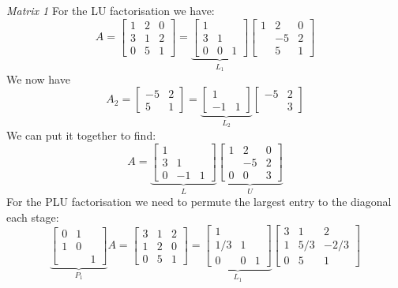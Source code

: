 \documentclass[12pt,a4paper]{article}
\begin{document}
\emph{Matrix 1} For the LU factorisation we have:
\[
A = \begin{bmatrix}
1 & 2 & 0 \\
3 & 1 & 2 \\
0 & 5 & 1
\end{bmatrix}= \underbrace{\begin{bmatrix}
1 \\
3 & 1 \\
0 & 0 & 1
\end{bmatrix}}_{L_1}   \begin{bmatrix}
1 & 2 & 0 \\
 & -5 & 2 \\
 & 5 & 1
\end{bmatrix}
\]
We now have
\[
A_2 = \begin{bmatrix}
  -5 & 2 \\
  5 & 1 \end{bmatrix} = 
  \underbrace{\begin{bmatrix}
    1\\
    -1 & 1
\end{bmatrix}}_{L_2}   \begin{bmatrix}
  -5 & 2 \\
   & 3 \end{bmatrix}
\]
We can put it together to find:
\[
A = \underbrace{\begin{bmatrix}
1 \\
3 & 1 \\
0 & -1 & 1
\end{bmatrix}}_{L} \underbrace{\begin{bmatrix}
1 & 2 & 0\\
 & -5 & 2 \\
0 & 0 & 3
\end{bmatrix}}_{U}
\]
For the PLU factorisation we need to permute the largest entry to the diagonal each stage:
\[
\underbrace{\begin{bmatrix} 0 & 1 \\
1 & 0 \\
&& 1 \end{bmatrix}}_{P_1} A = \begin{bmatrix}
3 & 1 & 2 \\
1 & 2 & 0 \\
0 & 5 & 1
\end{bmatrix} = \underbrace{\begin{bmatrix}
1 &  &  \\
1/3 & 1 &  \\
0 & 0 & 1
\end{bmatrix}}_{L_1} \begin{bmatrix}
3 & 1 & 2 \\
1 & 5/3 & -2/3 \\
0 & 5 & 1
\end{bmatrix}
\]
\end{document}
